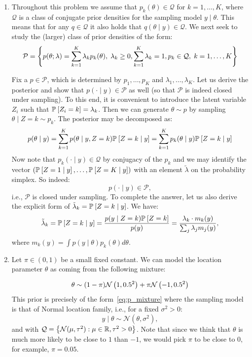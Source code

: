 \begin{enumerate}[label=(\alph*)]
\item Throughout this problem we assume that $p_k(\theta) \in \mathcal{Q}$ for $k=1,\dotsc,K$, where $\mathcal{Q}$ is a class of conjugate prior densities for the sampling model $y \mid \theta$.  This means that for any $q \in \mathcal{Q}$ it also holds that $q(\theta \mid y) \in \mathcal{Q}$. We next seek to study the (larger) class of prior densities of the form:
\begin{equation}
\label{eq:p_mixture}
\mathcal{P} = \left\{ p(\theta;\lambda) = \sum_{k=1}^K \lambda_k p_k(\theta), \; \lambda_k \geq 0, \sum_{k=1}^K \lambda_k = 1, p_k \in \mathcal{Q},\;k=1,\dotsc,K\right\}
\end{equation}

Fix a $p \in \mathcal{P}$, which is determined by $p_1,\dotsc,p_K$ and $\lambda_1,\dotsc, \lambda_K$. Let us derive the posterior and show that $p(\cdot \mid y) \in \mathcal{P}$ as well (so that $\mathcal{P}$ is indeed closed under sampling). To this end, it is convenient to introduce the latent variable $Z_i$ such that $\mathbb{P}_{}\left[Z_i =k\right] = \lambda_k$. Then we can generate $\theta \sim p$ by sampling $\theta \mid Z =k \sim p_k$. The posterior may be decomposed as:
$$ p(\theta \mid y) = \sum_{k=1}^K p(\theta \mid y, Z=k)\mathbb{P}_{}\left[Z=k \mid y\right] = \sum_{k=1}^K p_k(\theta \mid y)\mathbb{P}_{}\left[Z=k \mid y\right]$$
Now note that $p_k(\cdot \mid y) \in \mathcal{Q}$ by conjugacy of the $p_k$ and we may identify the vector $\left(\mathbb{P}_{}\left[Z=1 \mid y\right],\dotsc, \mathbb{P}_{}\left[Z=K \mid y\right]\right)$ with an element $\tilde{\lambda}$ on the probability simplex. So indeed:
$$ p(\cdot \mid y) \in \mathcal{P},$$ 
i.e., $\mathcal{P}$ is closed under sampling. To complete the answer, let us also derive the explicit form of $\tilde{\lambda}_k=\mathbb{P}_{}\left[Z=k \mid y\right]$. We have:
$$\tilde{\lambda}_k = \mathbb{P}_{}\left[Z=k \mid y\right] = \frac{ p(y \mid Z=k)\mathbb{P}_{}\left[Z=k\right]}{p(y)} = \frac{ \lambda_k \cdot m_k(y)}{ \sum_j \lambda_j m_j(y)},$$
where $m_k(y) = \int p(y \mid \theta) p_k(\theta) d\theta$.

\item Let $\pi \in (0,1)$ be a small fixed constant. We can model the location parameter $\theta$ as coming from the following mixture:

\begin{equation}
\label{eq:part_b_prior}
\theta \sim (1-\pi) \mathcal{N}\left(1, 0.5^2\right) +  \pi \mathcal{N}\left(-1, 0.5^2\right)
\end{equation}
This prior is precisely of the form~\eqref{eq:p_mixture} where the sampling model is that of Normal location family, i.e., for a fixed $\sigma^2>0$:
$$y \mid \theta \sim \mathcal{N}(\theta, \sigma^2),$$
and with $\mathcal{Q}  = \left\{\mathcal{N}(\mu, \tau^2): \mu \in \mathbb{R}, \tau^2 > 0\right\}$. Note that since we think that $\theta$ is much more likely to be close to $1$ than $-1$, we would pick $\pi$ to be close to $0$, for example, $\pi=0.05$.


\end{enumerate}
